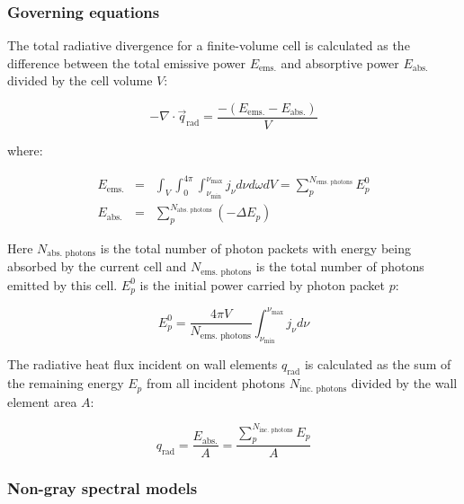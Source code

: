 \subsubsection{Governing equations}

The total radiative divergence for a finite-volume cell is calculated as the difference between the total emissive power $E_{\text{ems.}}$ and absorptive power $E_{\text{abs.}}$ divided by the cell volume $V$:

\begin{equation}
 - \nabla \cdot \vec{q}_\text{rad} = \frac{ - \left ( E_{\text{ems.}} - E_{\text{abs.}} \right ) }{V}
 \label{eq:my_divq}
\end{equation}

\noindent where:

\begin{eqnarray}
 E_{\text{ems.}} &=& \int_{V} \int_{0}^{{4\pi}} \int_{\nu_{\text{min}}}^{\nu_{\text{max}}} j_{\nu} d\nu d\omega dV = \sum_{p}^{N_{\text{ems. photons}}} E_{p}^0 \label{eq:E_emission} \\
 E_{\text{abs.}} &=& \sum_{p}^{N_{\text{abs. photons}}} \left ( - \Delta E_{p} \right ) \label{eq:E_absorption} 
\end{eqnarray}

\noindent Here $N_{\text{abs. photons}}$ is the total number of photon packets with energy being absorbed by the current cell and $N_{\text{ems. photons}}$ is the total number of photons emitted by this cell.
$E_{p}^0$ is the initial power carried by photon packet $p$:

\begin{equation}
 E_{p}^0 = \frac{ 4 \pi V  }{ N_{\text{ems. photons} } } \int_{\nu_{\text{min}}}^{\nu_{\text{max}}} j_{\nu} d \nu
\end{equation}

The radiative heat flux incident on wall elements $q_\text{rad}$ is calculated as the sum of the remaining energy $E_{p}$ from all incident photons $N_\text{inc. photons}$ divided by the wall element area $A$:

\begin{equation}
 q_\text{rad} = \frac{ E_\text{abs.} }{A} =  \frac{ \displaystyle \sum_{p}^{N_{\text{inc. photons}}} \displaystyle E_{p} }{ A }
 \label{eq:my_divq}
\end{equation}

\subsubsection{Non-gray spectral models}

